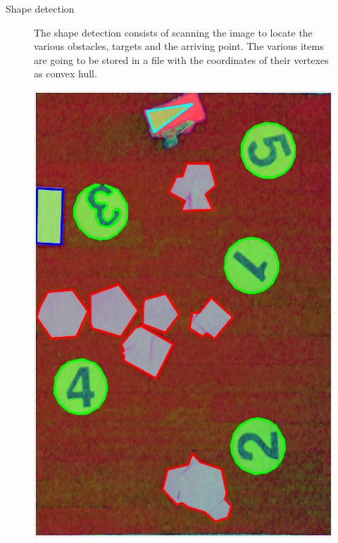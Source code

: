 \begin{frame}[fragile]{Shape detection}
\begin{figure}[H]
	\begin{minipage}{0.45\linewidth}
		The shape detection consists of scanning the image to locate the various obstacles, targets and the arriving point. \newline
		The various items are going to be stored in a file with the coordinates of their vertexes as convex hull. 
	\end{minipage}
	\vspace{0.07\linewidth}
	\begin{minipage}{0.48\linewidth}
		\includegraphics[width=\linewidth]{Immagini/all_detect}
	\end{minipage}
\end{figure}
\end{frame}


